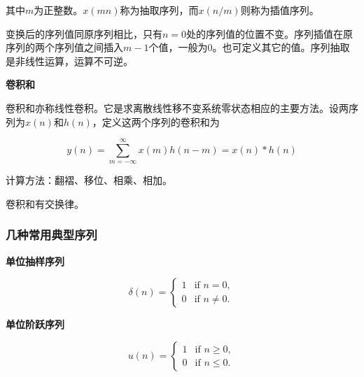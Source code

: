 \documentclass[cn, hazy, blue, normal, 14pt]{elegantnote}
\begin{document}
其中$m$为正整数。$x(mn)$称为抽取序列，而$x(n/m)$则称为插值序列。

变换后的序列值同原序列相比，只有$n=0$处的序列值的位置不变。序列插值在原序列的两个序列值之间插入$m-1$个值，一般为$0$。也可定义其它的值。序列抽取是非线性运算，运算不可逆。

\textbf{卷积和}

卷积和亦称线性卷积。它是求离散线性移不变系统零状态相应的主要方法。设两序列为$x(n)$和$h(n)$，定义这两个序列的卷积和为

\begin{equation}
        y(n)=\sum_{m=-\infty}^{\infty}{x(m)h(n-m)}=x(n)\ast h(n)
\end{equation}

计算方法：翻褶、移位、相乘、相加。

卷积和有交换律。

\subsubsection{几种常用典型序列}

\textbf{单位抽样序列}

\begin{equation}
        \delta(n)= \left\{
        \begin{array}{rl}
        1 & \text{if } n = 0,\\
        0 & \text{if } n \neq 0.
        \end{array}
        \right.
\end{equation}

\begin{center}
\end{center}

\textbf{单位阶跃序列}

\begin{equation}
        u(n)= \left\{
        \begin{array}{rl}
        1 & \text{if } n \geq 0,\\
        0 & \text{if } n \leq 0.
        \end{array}
        \right.
\end{equation}
\end{document}
